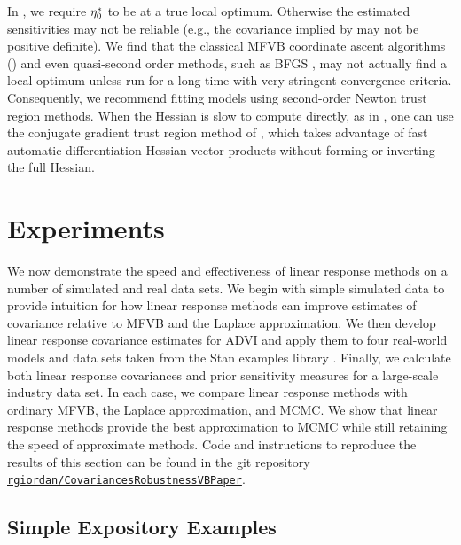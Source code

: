 \documentclass{article}\usepackage[]{graphicx}\usepackage[]{color}
\theoremstyle{definition}
\theoremstyle{plain}
\theoremstyle{plain}
\theoremstyle{plain}
\theoremstyle{definition}
\theoremstyle{plain}
\theoremstyle{plain}
\begin{document}
In , we require $\eta_{0}^{*}$ to be at a true local
optimum. Otherwise the estimated sensitivities may not be reliable (e.g., the
covariance implied by  may not be positive
definite). We find that the classical MFVB coordinate ascent algorithms
(\citet[Section 2.4]{blei:2016:variational}) and even quasi-second order
methods, such as BFGS \citep[e.g.,][]{regier:2015:celeste}, may not actually find
a local optimum unless run for a long time with very stringent convergence
criteria. Consequently, we recommend fitting models using second-order Newton
trust region methods. When the Hessian is slow to compute directly, as in
, one can use the conjugate gradient trust region
method of \citet[ Chapter 7]{nocedalwright:1999:numerical}, which takes
advantage of fast automatic differentiation Hessian-vector products without
forming or inverting the full Hessian.
 

\section{Experiments
\label{sec:experiments} }

We now demonstrate the speed and effectiveness of linear response methods on a
number of simulated and real data sets.  We begin with simple simulated data to
provide intuition for how linear response methods can improve estimates of
covariance relative to MFVB and the Laplace approximation.  We then develop
linear response covariance estimates for ADVI and apply them to four real-world
models and data sets taken from the Stan examples library \citep{stan-examples:2017}. Finally, we calculate both
linear response covariances and prior sensitivity measures for a large-scale
industry data set.  In each case, we compare linear response methods with
ordinary MFVB, the Laplace approximation, and MCMC. We show that linear response
methods provide the best approximation to MCMC while still retaining the
speed of approximate methods. Code and instructions to reproduce the results of
this section can be found in the git repository
\href{https://github.com/rgiordan/CovariancesRobustnessVBPaper}{\texttt{rgiordan/CovariancesRobustnessVBPaper}}.
 
\subsection{Simple Expository Examples
\label{subsec:laplace_experiments}}
\end{document}
